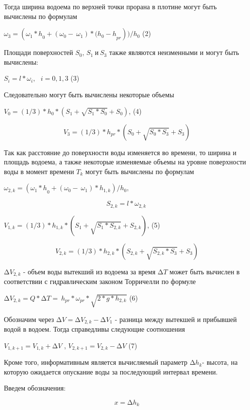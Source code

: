 {Тогда ширина водоема по верхней точки прорана в плотине могут быть
вычислены по формулам

\(\omega_{3} = ({\omega_{1}*h}_{0} + \left( \omega_{0} - \ \omega_{1} \right)*{(h_{0} - h}_{pr}))/h_{0}\)
(2)

Площади поверхностей \(S_{0}\), \(S_{1}\ и\ S_{3}\) также являются
неизменными и могут быть вычислены:

\(S_{i} = l*\omega_{i},\ \ \ i = 0,1,3\) (3)

Следовательно могут быть вычислены некоторые объемы

\(V_{0} = (1/3)*h_{0}*\left( S_{1} + \sqrt{S_{1}*S_{0}} + S_{0} \right)\),
(4)

\[\ V_{3} = (1/3)*h_{pr}*\left( S_{0} + \sqrt{S_{0}*S_{3}} + S_{3} \right)\]

Так как расстояние до поверхности воды изменяется во времени, то ширина
и площадь водоема, а также некоторые изменяемые объемы на уровне
поверхности воды в момент времени \(T_{k}\) могут быть вычислены по
формулам

\(\omega_{2,k} = ({\omega_{1}*h}_{0} + \left( \omega_{0} - \ \omega_{1} \right)*h_{1,k})/h_{0}\),

\[S_{2,k} = l*\omega_{2,k}\]

\(V_{1,k} = (1/3)*h_{1,k}*\left( S_{1} + \sqrt{S_{1}*S_{2,k}} + S_{2,k} \right)\),
(5)

\[\ V_{2,k} = (1/3)*h_{2,k}*\left( S_{2,k} + \sqrt{S_{2,k}*S_{3}} + S_{3} \right)\]

\(\mathrm{\Delta}V_{2,k}\) - объем воды вытекший из водоема за время
\(\mathrm{\Delta}T\) может быть вычислен в соответствии с гидравлическим
законом Торричелли по формуле

\(\mathrm{\Delta}V_{2,k} = Q*\mathrm{\Delta}T = \ h_{pr}*\omega_{pr}*\sqrt{2*g*h_{2,k}}\)
(6)

Обозначим через
\(\mathrm{\Delta}V = \mathrm{\Delta}V_{2,k} - \mathrm{\Delta}V_{1}\) -
разница между вытекшей и прибывшей водой в водоем. Тогда справедливы
следующие соотношения

\(V_{1,k + 1} = V_{1,k} + \mathrm{\Delta}V\) ,
\(V_{2,k + 1} = V_{2,k} - \mathrm{\Delta}V\) (7)

Кроме того, информативным является вычисляемый параметр
\({\mathrm{\Delta}h}_{k}\)- высота, на которую ожидается опускание воды
за последующий интервал времени.

Введем обозначения:

\[\ {x = \mathrm{\Delta}h}_{k}\]

}

